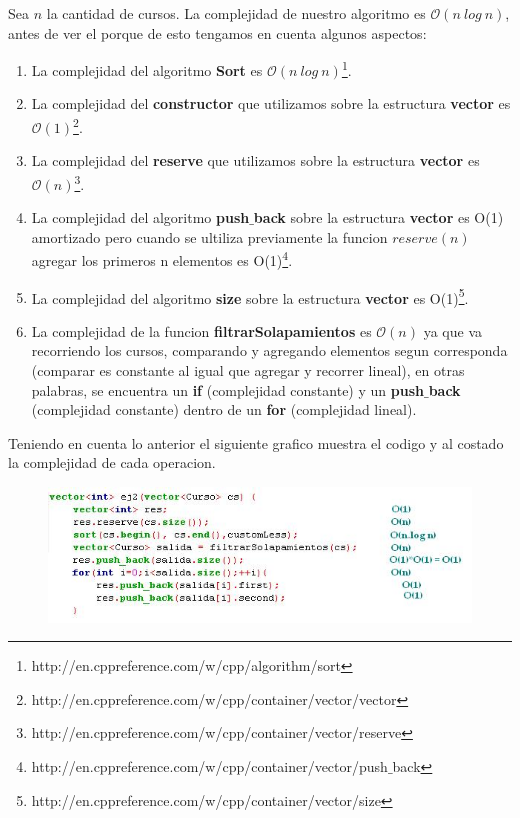 \begin{itemize}
Sea $n$ la cantidad de cursos. La complejidad de nuestro algoritmo es $\mathcal{O}(n\ log\ n)$, antes de ver el porque de esto tengamos en cuenta algunos aspectos:
\begin{enumerate}
\item La complejidad del algoritmo \textbf{Sort} es $\mathcal{O}(n\ log\ n)$\footnote{http://en.cppreference.com/w/cpp/algorithm/sort}.
\item La complejidad del \textbf{constructor} que utilizamos sobre la estructura \textbf{vector} es $\mathcal{O}(1)$\footnote{http://en.cppreference.com/w/cpp/container/vector/vector}.
\item La complejidad del \textbf{reserve} que utilizamos sobre la estructura \textbf{vector} es $\mathcal{O}(n)$\footnote{http://en.cppreference.com/w/cpp/container/vector/reserve}.
\item La complejidad del algoritmo \textbf{push$\_$back} sobre la estructura \textbf{vector} es O(1) amortizado pero cuando se ultiliza previamente la funcion $reserve(n)$ agregar los primeros n elementos es O(1)\footnote{http://en.cppreference.com/w/cpp/container/vector/push$\_$back}. 
\item La complejidad del algoritmo \textbf{size} sobre la estructura \textbf{vector} es O(1)\footnote{http://en.cppreference.com/w/cpp/container/vector/size}.
\item La complejidad de la funcion \textbf{filtrarSolapamientos} es $\mathcal{O}(n)$ ya que va recorriendo los cursos, comparando y agregando elementos segun corresponda (comparar es constante al igual que agregar y recorrer lineal), en otras palabras, se encuentra un \textbf{if} (complejidad constante) y un \textbf{push$\_$back} (complejidad constante) dentro de un \textbf{for} (complejidad lineal). 
\end{enumerate}
Teniendo en cuenta lo anterior el siguiente grafico muestra el codigo y al costado la complejidad de cada operacion.

\begin{figure}[H] %
\begin{center}
\includegraphics[]{../imgs/comple2.jpg}
\end{center}
\end{figure}


\end{itemize}
